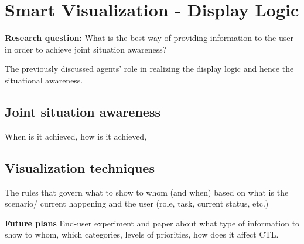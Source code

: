 \chapter{Smart Visualization - Display Logic}

\textbf{Research question:} What is the best way of providing information to the user in order to achieve joint situation awareness? 

The previously discussed agents' role in realizing the display logic and hence the situational awareness.

\section{Joint situation awareness}

When is it achieved, how is it achieved,

\section{Visualization techniques}

The rules that govern what to show to whom (and when) based on what is the scenario/ current happening and the user (role, task, current status, etc.) 

\textbf{Future plans} End-user experiment and paper about what type of information to show to whom, which categories, levels of priorities, how does it affect CTL.
  
  
  
  
  